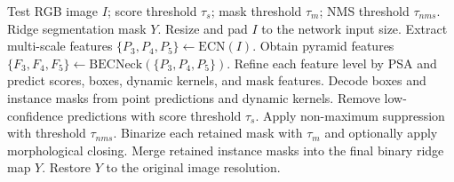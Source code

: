 \begin{algorithm}[t]
\caption{Inference procedure of D-RTMDet}
\label{alg:drtmdet_infer}
\begin{algorithmic}[1]
\Require Test RGB image $I$; score threshold $\tau_s$; mask threshold $\tau_m$; NMS threshold $\tau_{nms}$.
\Ensure Ridge segmentation mask $Y$.
\State Resize and pad $I$ to the network input size.
\State Extract multi-scale features $\{P_3,P_4,P_5\}\gets \mathrm{ECN}(I)$.
\State Obtain pyramid features $\{F_3,F_4,F_5\}\gets \mathrm{BECNeck}(\{P_3,P_4,P_5\})$.
\State Refine each feature level by PSA and predict scores, boxes, dynamic kernels, and mask features.
\State Decode boxes and instance masks from point predictions and dynamic kernels.
\State Remove low-confidence predictions with score threshold $\tau_s$.
\State Apply non-maximum suppression with threshold $\tau_{nms}$.
\State Binarize each retained mask with $\tau_m$ and optionally apply morphological closing.
\State Merge retained instance masks into the final binary ridge map $Y$.
\State Restore $Y$ to the original image resolution.
\end{algorithmic}
\end{algorithm}
